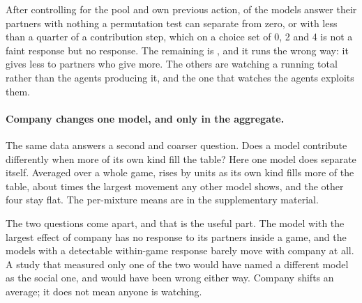 

After controlling for the pool and own previous action, \ErecipNBlind{} of the \EthreebModels{} models answer their partners
with nothing a permutation test can separate from zero, or with less than a quarter of a
contribution step, which on a choice set of 0, 2 and 4 is not a faint response but no
response. The remaining \ErecipNReal{} is \ErecipRealModels, and it runs the wrong way:
it gives less to partners who give more. The others are watching a running total rather
than the agents producing it, and the one that watches the agents exploits them.

\paragraph{Company changes one model, and only in the aggregate.}
The same data answers a second and coarser question. Does a model contribute differently
when more of its own kind fill the table? Here one model does separate itself.
Averaged over a whole game, \EcompTopModel{} rises by \EcompTopSpan{} units as its own
kind fills more of the table, about \EcompRatio{} times the largest movement any other
model shows, and the other four stay flat. The per-mixture means are in the supplementary
material.


The two questions come apart, and that is the useful part. The model with the largest
effect of company has no response to its partners inside a game, and the models with a
detectable within-game response barely move with company at all. A study that measured
only one of the two would have named a different model as the social one, and would have
been wrong either way. Company shifts an average; it does not mean anyone is watching.

